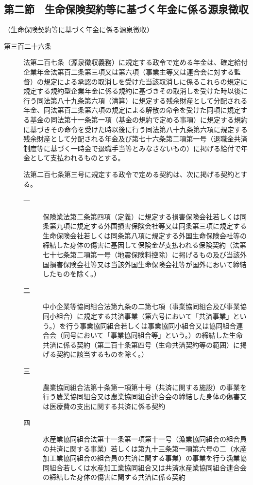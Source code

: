\documentclass[twocolumn,a4j,10pt]{ltjtarticle}
\begin{document}
\subsection*{第二節　生命保険契約等に基づく年金に係る源泉徴収}
\noindent\hspace{10pt}（生命保険契約等に基づく年金に係る源泉徴収）
\begin{description}
\item[第三百二十六条]法第二百七条（源泉徴収義務）に規定する政令で定める年金は、確定給付企業年金法第百二条第三項又は第六項（事業主等又は連合会に対する監督）の規定による承認の取消しを受けた当該取消しに係るこれらの規定に規定する規約型企業年金に係る規約に基づきその取消しを受けた時以後に行う同法第八十九条第六項（清算）に規定する残余財産として分配される年金、同法第百二条第六項の規定による解散の命令を受けた同項に規定する基金の同法第十一条第一項（基金の規約で定める事項）に規定する規約に基づきその命令を受けた時以後に行う同法第八十九条第六項に規定する残余財産として分配される年金及び第七十六条第二項第一号（退職金共済制度等に基づく一時金で退職手当等とみなさないもの）に掲げる給付で年金として支払われるものとする。
\item[]法第二百七条第三号に規定する政令で定める契約は、次に掲げる契約とする。
\begin{description}
\item[一]保険業法第二条第四項（定義）に規定する損害保険会社若しくは同条第九項に規定する外国損害保険会社等又は同条第三項に規定する生命保険会社若しくは同条第八項に規定する外国生命保険会社等の締結した身体の傷害に基因して保険金が支払われる保険契約（法第七十七条第二項第一号（地震保険料控除）に掲げるもの及び当該外国損害保険会社等又は当該外国生命保険会社等が国外において締結したものを除く。）
\item[二]中小企業等協同組合法第九条の二第七項（事業協同組合及び事業協同小組合）に規定する共済事業（第六号において「共済事業」という。）を行う事業協同組合若しくは事業協同小組合又は協同組合連合会（同号において「事業協同組合等」という。）の締結した生命共済に係る契約（第二百十条第四号（生命共済契約等の範囲）に掲げる契約に該当するものを除く。）
\item[三]農業協同組合法第十条第一項第十号（共済に関する施設）の事業を行う農業協同組合又は農業協同組合連合会の締結した身体の傷害又は医療費の支出に関する共済に係る契約
\item[四]水産業協同組合法第十一条第一項第十一号（漁業協同組合の組合員の共済に関する事業）若しくは第九十三条第一項第六号の二（水産加工業協同組合の組合員の共済に関する事業）の事業を行う漁業協同組合若しくは水産加工業協同組合又は共済水産業協同組合連合会の締結した身体の傷害に関する共済に係る契約

\end{description}
\end{description}
\end{document}
